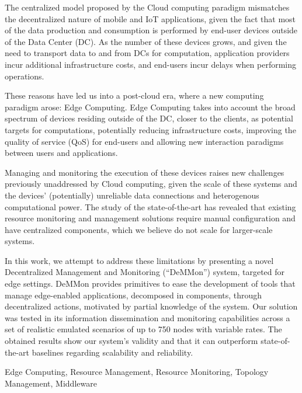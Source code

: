 

The centralized model proposed by the Cloud computing paradigm mismatches the decentralized nature of mobile and IoT applications, given the fact that most of the data production and consumption is performed by end-user devices outside of the Data Center (DC). As the number of these devices grows, and given the need to transport data to and from DCs for computation, application providers incur additional infrastructure costs, and end-users incur delays when performing operations. 

These reasons have led us into a post-cloud era, where a new computing paradigm arose: Edge Computing. Edge Computing takes into account the broad spectrum of devices residing outside of the DC, closer to the clients, as potential targets for computations, potentially reducing infrastructure costs, improving the quality of service (QoS) for end-users and allowing new interaction paradigms between users and applications. 

Managing and monitoring the execution of these devices raises new challenges previously unaddressed by Cloud computing, given the scale of these systems and the devices' (potentially) unreliable data connections and heterogenous computational power. The study of the state-of-the-art has revealed that existing resource monitoring and management solutions require manual configuration and have centralized components, which we believe do not scale for larger-scale systems. 

In this work, we attempt to address these limitations by presenting a novel Decentralized Management and Monitoring (``DeMMon'') system, targeted for edge settings. DeMMon provides primitives to ease the development of tools that manage edge-enabled applications, decomposed in components, through decentralized actions, motivated by partial knowledge of the system. Our solution was tested in its information dissemination and monitoring capabilities across a set of realistic emulated scenarios of up to 750 nodes with variable rates. The obtained results show our system's validity and that it can outperform state-of-the-art baselines regarding scalability and reliability. 


\begin{keywords}
  Edge Computing, Resource Management, Resource Monitoring, Topology Management, Middleware
\end{keywords} 
